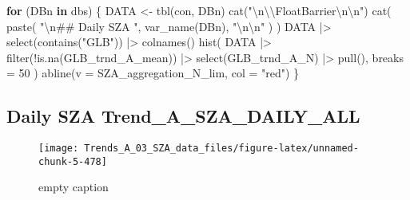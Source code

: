\documentclass[
  10pt,
  a4paper,oneside]{article}
\newenvironment{Shaded}{\begin{snugshade}}{\end{snugshade}}
\newcommand{\AttributeTok}[1]{\textcolor[rgb]{0.77,0.63,0.00}{#1}}
\newcommand{\ControlFlowTok}[1]{\textcolor[rgb]{0.13,0.29,0.53}{\textbf{#1}}}
\newcommand{\DecValTok}[1]{\textcolor[rgb]{0.00,0.00,0.81}{#1}}
\newcommand{\FunctionTok}[1]{\textcolor[rgb]{0.00,0.00,0.00}{#1}}
\newcommand{\NormalTok}[1]{#1}
\newcommand{\OtherTok}[1]{\textcolor[rgb]{0.56,0.35,0.01}{#1}}
\newcommand{\SpecialCharTok}[1]{\textcolor[rgb]{0.00,0.00,0.00}{#1}}
\newcommand{\StringTok}[1]{\textcolor[rgb]{0.31,0.60,0.02}{#1}}
\begin{document}
\begin{Shaded}
\begin{Highlighting}[]
\ControlFlowTok{for}\NormalTok{ (DBn }\ControlFlowTok{in}\NormalTok{ dbs) \{}
\NormalTok{    DATA }\OtherTok{\textless{}{-}} \FunctionTok{tbl}\NormalTok{(con, DBn)}
    \FunctionTok{cat}\NormalTok{(}\StringTok{"}\SpecialCharTok{\textbackslash{}n\textbackslash{}\textbackslash{}}\StringTok{FloatBarrier}\SpecialCharTok{\textbackslash{}n\textbackslash{}n}\StringTok{"}\NormalTok{)}
    \FunctionTok{cat}\NormalTok{(}
        \FunctionTok{paste}\NormalTok{(}
            \StringTok{"}\SpecialCharTok{\textbackslash{}n}\StringTok{\#\# Daily SZA "}\NormalTok{, }\FunctionTok{var\_name}\NormalTok{(DBn),}
            \StringTok{"}\SpecialCharTok{\textbackslash{}n\textbackslash{}n}\StringTok{"}
\NormalTok{        )}
\NormalTok{    )}
\NormalTok{    DATA }\SpecialCharTok{|\textgreater{}}
        \FunctionTok{select}\NormalTok{(}\FunctionTok{contains}\NormalTok{(}\StringTok{"GLB"}\NormalTok{)) }\SpecialCharTok{|\textgreater{}}
        \FunctionTok{colnames}\NormalTok{()}
    \FunctionTok{hist}\NormalTok{(}
\NormalTok{        DATA }\SpecialCharTok{|\textgreater{}}
            \FunctionTok{filter}\NormalTok{(}\SpecialCharTok{!}\FunctionTok{is.na}\NormalTok{(GLB\_trnd\_A\_mean)) }\SpecialCharTok{|\textgreater{}}
            \FunctionTok{select}\NormalTok{(GLB\_trnd\_A\_N) }\SpecialCharTok{|\textgreater{}}
            \FunctionTok{pull}\NormalTok{(), }\AttributeTok{breaks =} \DecValTok{50}
\NormalTok{    )}
    \FunctionTok{abline}\NormalTok{(}\AttributeTok{v =}\NormalTok{ SZA\_aggregation\_N\_lim, }\AttributeTok{col =} \StringTok{"red"}\NormalTok{)}
\NormalTok{\}}
\end{Highlighting}
\end{Shaded}

\FloatBarrier

\hypertarget{daily-sza-trend_a_sza_daily_all}{%
\subsection{Daily SZA Trend\_A\_SZA\_DAILY\_ALL}\label{daily-sza-trend_a_sza_daily_all}}

\begin{figure}[!ht]

{\centering \texttt{[image: Trends\_A\_03\_SZA\_data\_files/figure-latex/unnamed-chunk-5-478]} 

}

\caption{ empty caption }\label{fig:unnamed-chunk-5-478}
\end{figure}
\end{document}
